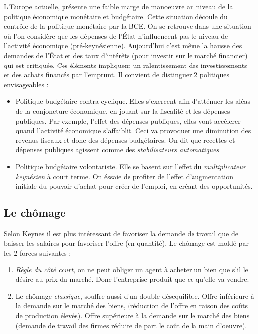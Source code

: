 L'Europe actuelle, présente une faible marge de manoeuvre au niveau de la politique économique monétaire et budgétaire. Cette situation découle du contrôle de 
la politique monétaire par la BCE. On se retrouve dans une situation où l'on considère que les dépenses de l'État n'influencent pas le niveau de l'activité 
économique (pré-keynésienne). Aujourd'hui c'est même la hausse des demandes de l'État et des taux d'intérêts (pour investir sur le marché financier) qui est 
critiquée. Ces éléments impliquent un ralentissement des investissements et des achats financés par l'emprunt. Il convient de distinguer 2 politiques 
envisageables : 
\begin{itemize}[label=]
	\item Politique budgétaire contra-cyclique. Elles s'exercent afin d'atténuer les aléas de la conjoncture économique, en jouant sur la fiscalité et les 
	dépenses publiques. Par exemple, l'effet des dépenses publiques, elles vont accélerer quand l'activité économique s'affaiblit. Ceci va provoquer une 
	diminution des revenus fiscaux et donc des dépenses budgétaires. On dit que recettes et dépenses publiques agissent comme des \emph{stabilisateurs
	automatiques}
	\item Politique budgétaire volontariste. Elle se basent sur l'effet du \emph{multiplicateur keynésien} à court terme. On éssaie de profiter de l'effet
	d'augmentation initiale du pouvoir d'achat pour créer de l'emploi, en créant des opportunités. 
\end{itemize}


\subsection{Le chômage} %
\label{sub:le_chomage}

Selon Keynes il est plus intéressant de favoriser la demande de travail que de baisser les salaires pour favoriser l'offre (en quantité).
Le chômage est moldé par les 2 forces suivantes : 
\begin{enumerate}
	\item \emph{Règle du côté court}, on ne peut obliger un agent à acheter un bien que s'il le désire au prix du marché. Donc l'entreprise produit que ce 
	qu'elle va vendre.
	\item Le chômage \emph{classique}, souffre aussi d'un double désequilibre. Offre inférieure à la demande sur le marché des biens, (réduction de l'offre
	en raison des coûts de production élevés). Offre supérieure à la demande sur le marché des biens (demande de travail des firmes réduite de part 
	le coût de la main d'oeuvre).
\end{enumerate}

